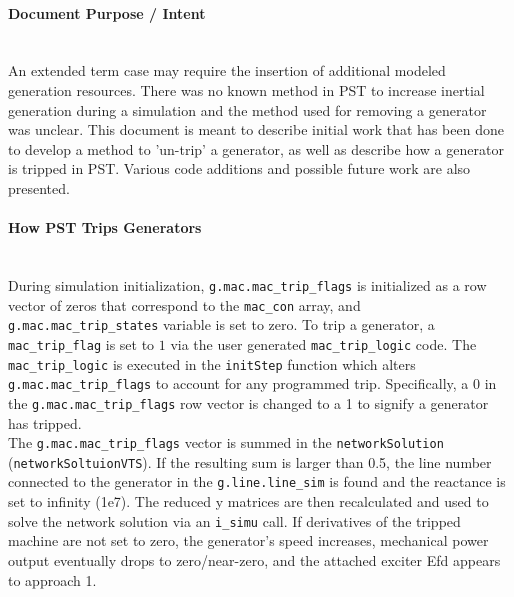 \documentclass[12pt]{article}
\begin{document}
\onehalfspacing
\paragraph{Document Purpose / Intent} \ \\
An extended term case may require the insertion of additional modeled generation resources.
There was no known method in PST to increase inertial generation during a simulation and the method used for removing a generator was unclear.
This document is meant to describe initial work that has been done to develop a method to 'un-trip' a generator, as well as describe how a generator is tripped in PST.
Various code additions and possible future work are also presented.


\paragraph{How PST Trips Generators} \ \\
During simulation initialization, \verb|g.mac.mac_trip_flags| is initialized as a row vector of zeros that correspond to the \verb|mac_con| array, and 
\verb|g.mac.mac_trip_states| variable is set to zero. %
To trip a generator, a \verb|mac_trip_flag| is set to $1$ via the user generated \verb|mac_trip_logic| code.
The \verb|mac_trip_logic| is executed in the \verb|initStep| function which alters \verb|g.mac.mac_trip_flags| to account for any programmed trip.
Specifically, a $0$ in the \verb|g.mac.mac_trip_flags| row vector is changed to a 1 to signify a generator has tripped.\\


The \verb|g.mac.mac_trip_flags| vector is summed in the \verb|networkSolution| (\verb|networkSoltuionVTS|).
If the resulting sum is larger than 0.5, the line number connected to the generator in the \verb|g.line.line_sim| is found and the reactance is set to infinity (1e7).
The reduced y matrices are then recalculated and used to solve the network solution via an \verb|i_simu| call.
If derivatives of the tripped machine are not set to zero, the generator's speed increases, mechanical power output eventually drops to zero/near-zero, and the attached exciter Efd appears to approach 1.

\end{document}
